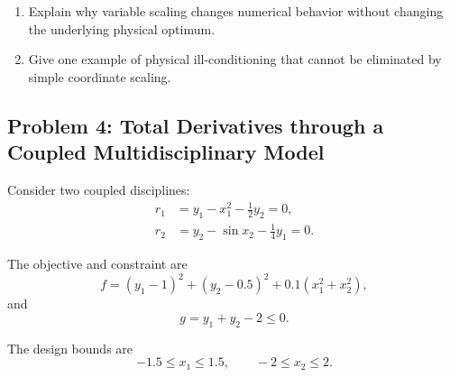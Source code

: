 \begin{enumerate}
    \item Explain why variable scaling changes numerical behavior without
    changing the underlying physical optimum.

    \item Give one example of physical ill-conditioning that cannot be
    eliminated by simple coordinate scaling.
\end{enumerate}


\subsection*{Problem 4: Total Derivatives through a Coupled Multidisciplinary Model}

Consider two coupled disciplines:
\begin{align}
r_1
&=
y_1-x_1^2-\frac{1}{2}y_2
=
0,
\\
r_2
&=
y_2-\sin x_2-\frac{1}{4}y_1
=
0.
\end{align}

The objective and constraint are
\begin{equation}
f
=
(y_1-1)^2
+
(y_2-0.5)^2
+
0.1(x_1^2+x_2^2),
\end{equation}
and
\begin{equation}
g=y_1+y_2-2\leq0.
\end{equation}

The design bounds are
\begin{equation}
-1.5\leq x_1\leq1.5,
\qquad
-2\leq x_2\leq2.
\end{equation}

